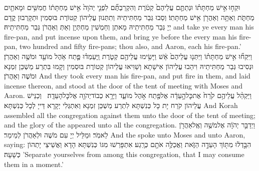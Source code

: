 {וּקְח֣וּ \legarmeh  אִ֣ישׁ מַחְתָּת֗וֹ וּנְתַתֶּ֤ם עֲלֵיהֶם֙ קְטֹ֔רֶת וְהִקְרַבְתֶּ֞ם לִפְנֵ֤י יְהֹוָה֙ אִ֣ישׁ מַחְתָּת֔וֹ חֲמִשִּׁ֥ים וּמָאתַ֖יִם מַחְתֹּ֑ת וְאַתָּ֥ה וְאַהֲרֹ֖ן אִ֥ישׁ מַחְתָּתֽוֹ׃}
{וְסַבוּ גְּבַר מַחְתִּיתֵיהּ וְתִתְּנוּן עֲלֵיהוֹן קְטוֹרֶת בּוּסְמִין וּתְקָרְבוּן קֳדָם יְיָ גְּבַר מַחְתִּיתֵיהּ מָאתַן וְחַמְשִׁין מַחְתְּיָן וְאַתְּ וְאַהֲרֹן גְּבַר מַחְתִּיתֵיהּ׃}
{and take ye every man his fire-pan, and put incense upon them, and bring ye before the \lord\space every man his fire-pan, two hundred and fifty fire-pans; thou also, and Aaron, each his fire-pan.’}{}
{וַיִּקְח֞וּ אִ֣ישׁ מַחְתָּת֗וֹ וַיִּתְּנ֤וּ עֲלֵיהֶם֙ אֵ֔שׁ וַיָּשִׂ֥ימוּ עֲלֵיהֶ֖ם קְטֹ֑רֶת וַֽיַּעַמְד֗וּ פֶּ֛תַח אֹ֥הֶל מוֹעֵ֖ד וּמֹשֶׁ֥ה וְאַהֲרֹֽן׃}
{וּנְסִיבוּ גְּבַר מַחְתִּיתֵיהּ וִיהַבוּ עֲלֵיהוֹן אִישָׁתָא וְשַׁוִּיאוּ עֲלֵיהוֹן קְטוֹרֶת בּוּסְמִין וְקָמוּ בִּתְרַע מַשְׁכַּן זִמְנָא וּמֹשֶׁה וְאַהֲרֹן׃}
{And they took every man his fire-pan, and put fire in them, and laid incense thereon, and stood at the door of the tent of meeting with Moses and Aaron.}{}
{וַיַּקְהֵ֨ל עֲלֵיהֶ֥ם קֹ֙רַח֙ אֶת\maqqaf כׇּל\maqqaf הָ֣עֵדָ֔ה אֶל\maqqaf פֶּ֖תַח אֹ֣הֶל מוֹעֵ֑ד וַיֵּרָ֥א כְבוֹד\maqqaf יְהֹוָ֖ה אֶל\maqqaf כׇּל\maqqaf הָעֵדָֽה׃ \setuma }
{וְכַנֵּישׁ עֲלֵיהוֹן קֹרַח יָת כָּל כְּנִשְׁתָּא לִתְרַע מַשְׁכַּן זִמְנָא וְאִתְגְּלִי יְקָרָא דַּייָ לְכָל כְּנִשְׁתָּא׃}
{And Korah assembled all the congregation against them unto the door of the tent of meeting; and the glory of the \lord\space appeared unto all the congregation.}{}
{וַיְדַבֵּ֣ר יְהֹוָ֔ה אֶל\maqqaf מֹשֶׁ֥ה וְאֶֽל\maqqaf אַהֲרֹ֖ן לֵאמֹֽר׃}
{וּמַלֵּיל יְיָ עִם מֹשֶׁה וּלְאַהֲרֹן לְמֵימַר׃}
{And the \lord\space spoke unto Moses and unto Aaron, saying:}{}
{הִבָּ֣דְל֔וּ מִתּ֖וֹךְ הָעֵדָ֣ה הַזֹּ֑את וַאֲכַלֶּ֥ה אֹתָ֖ם כְּרָֽגַע׃}
{אִתְפָּרַשׁוּ מִגּוֹ כְּנִשְׁתָּא הָדָא וַאֲשֵׁיצֵי יָתְהוֹן כְּשָׁעָה׃}
{’Separate yourselves from among this congregation, that I may consume them in a moment.’}{}
